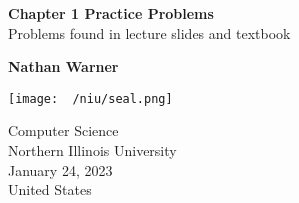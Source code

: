 \documentclass{report}
\title{\Huge{}}
\author{\huge{Nathan Warner}}
\date{\huge{}}
\begin{document}
        \begin{titlepage}
       \begin{center}
           \vspace*{1cm}
    
           \textbf{Chapter 1 Practice Problems} \\
           Problems found in lecture slides and textbook
    
           \vspace{0.5cm}
            
                
           \vspace{1.5cm}
    
           \textbf{Nathan Warner}
    
           \vfill
                
                
           \vspace{0.8cm}
         
           \texttt{[image: ~/niu/seal.png]}
                
           Computer Science \\
           Northern Illinois University\\
           January 24, 2023 \\
           United States\\
           
                
       \end{center}
    \end{titlepage}
    \tableofcontents
    \pagebreak 

    \pagebreak 
\end{document}
